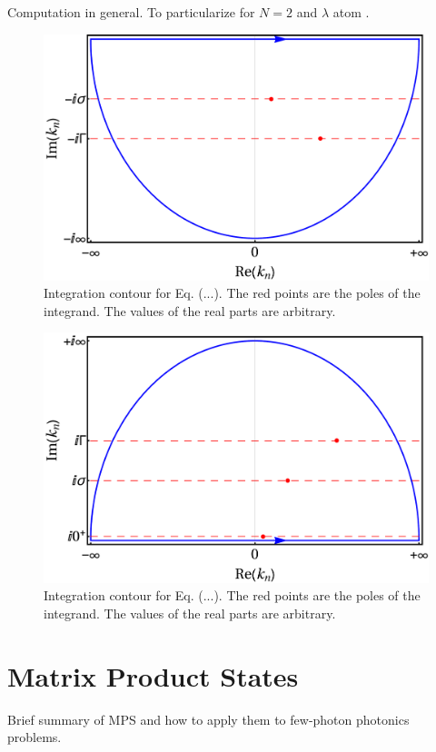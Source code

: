 \documentclass[aps,pra,reprint,amsmath,amssymb]{revtex4-1}
\begin{document}
Computation in general. To particularize for $N=2$ and $\lambda$ atom \cite{Xu2016}.

\begin{figure}
\includegraphics[scale=0.25]{lower_contour.pdf}
\caption{Integration contour for Eq. (...). The red points are the poles of the
integrand. The values of the real parts are arbitrary.}
\end{figure}

\begin{figure}
\includegraphics[scale=0.25]{upper_contour.pdf}
\caption{Integration contour for Eq. (...). The red points are the poles of the
integrand. The values of the real parts are arbitrary.}
\end{figure}


\section{Matrix Product States}

Brief summary of MPS and how to apply them to few-photon photonics problems.



\end{document}
